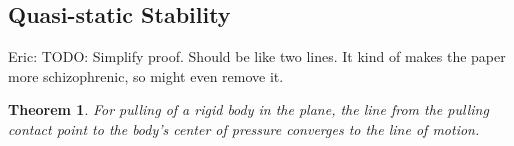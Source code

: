 \documentclass[conference]{IEEEtran}
\newtheorem{theorem}{Theorem}
\newcommand{\EH}[1]{{\color{blue} {Eric: {#1}}  }}
\newcommand{\TODO}[1]{{\color{red} {{#1}}  }}
\begin{document}

\subsection{Quasi-static Stability}\label{sec:stability}

\EH{TODO: Simplify proof. Should be like two lines. It kind of makes
  the paper more schizophrenic, so might even remove it.}

\begin{theorem}
  For pulling of a rigid body in the plane, the line from the pulling
  contact point to the body's center of pressure converges to the line
  of motion.
\end{theorem}
\end{document}
